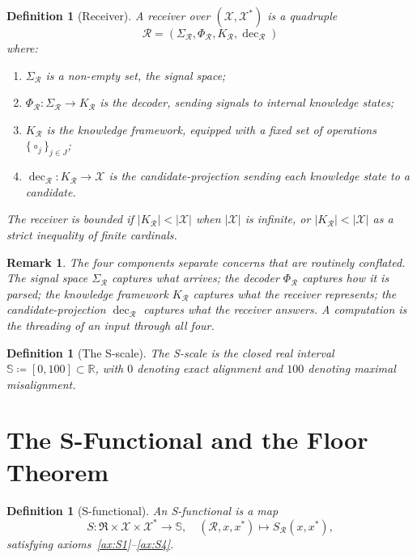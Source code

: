 \documentclass[twocolumn,a4paper]{article}
\newtheorem{definition}[theorem]{Definition}
\newtheorem{remark}[theorem]{Remark}
\DeclareMathOperator{\dec}{dec}
\newcommand{\Sscale}{\mathbb{S}}
\newcommand{\Real}{\mathbb{R}}
\newcommand{\Cands}{\mathcal{X}}
\newcommand{\Truth}{\mathcal{X}^{*}}
\newcommand{\receiver}{\mathcal{R}}
\newcommand{\Receiver}{\mathfrak{R}}
\newcommand{\Sscalar}{S}
\begin{document}
\begin{definition}[Receiver]
\label{def:receiver}
A \emph{receiver} over $(\Cands,\Truth)$ is a quadruple
\[
\receiver=(\Sigma_{\receiver},\Phi_{\receiver},K_{\receiver},\dec_{\receiver})
\]
where:
\begin{enumerate}[nosep,label=(\roman*)]
\item $\Sigma_{\receiver}$ is a non-empty set, the \emph{signal space};
\item $\Phi_{\receiver}\colon\Sigma_{\receiver}\to K_{\receiver}$ is the \emph{decoder}, sending signals to internal knowledge states;
\item $K_{\receiver}$ is the \emph{knowledge framework}, equipped with a fixed set of operations $\{\circ_{j}\}_{j\in J}$;
\item $\dec_{\receiver}\colon K_{\receiver}\to\Cands$ is the \emph{candidate-projection} sending each knowledge state to a candidate.
\end{enumerate}
The receiver is \emph{bounded} if $|K_{\receiver}|<|\Cands|$ when $|\Cands|$ is infinite, or $|K_{\receiver}|<|\Cands|$ as a strict inequality of finite cardinals.
\end{definition}

\begin{remark}
The four components separate concerns that are routinely conflated. The signal space $\Sigma_{\receiver}$ captures \emph{what arrives}; the decoder $\Phi_{\receiver}$ captures \emph{how it is parsed}; the knowledge framework $K_{\receiver}$ captures \emph{what the receiver represents}; the candidate-projection $\dec_{\receiver}$ captures \emph{what the receiver answers}. A computation is the threading of an input through all four.
\end{remark}

\begin{definition}[The S-scale]
\label{def:s-scale}
The \emph{S-scale} is the closed real interval $\Sscale\coloneqq[0,100]\subset\Real$, with $0$ denoting exact alignment and $100$ denoting maximal misalignment.
\end{definition}

\section{The S-Functional and the Floor Theorem}
\label{sec:s-functional}

\begin{definition}[S-functional]
\label{def:s-functional}
An \emph{S-functional} is a map
\[
\Sscalar\colon\Receiver\times\Cands\times\Truth\to\Sscale,
\quad
(\receiver,x,x^{*})\mapsto\Sscalar_{\receiver}(x,x^{*}),
\]
satisfying axioms~\ref{ax:S1}--\ref{ax:S4}.
\end{definition}
\end{document}
